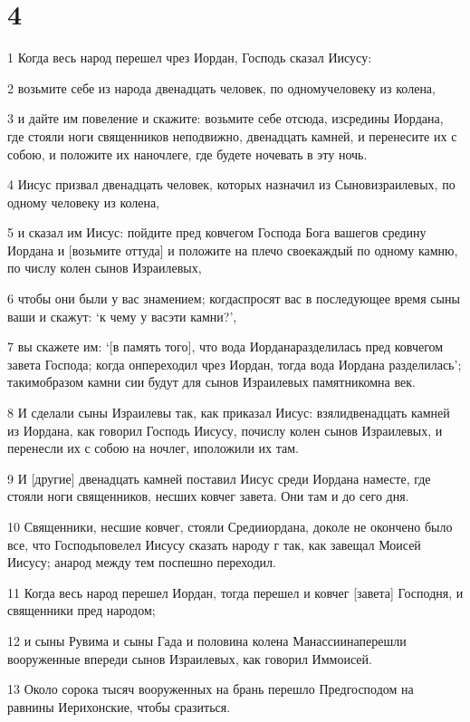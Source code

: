 \chapter{4}

\par 1 Когда весь народ перешел чрез Иордан, Господь сказал Иисусу:
\par 2 возьмите себе из народа двенадцать человек, по одномучеловеку из колена,
\par 3 и дайте им повеление и скажите: возьмите себе отсюда, изсредины Иордана, где стояли ноги священников неподвижно, двенадцать камней, и перенесите их с собою, и положите их наночлеге, где будете ночевать в эту ночь.
\par 4 Иисус призвал двенадцать человек, которых назначил из Сыновизраилевых, по одному человеку из колена,
\par 5 и сказал им Иисус: пойдите пред ковчегом Господа Бога вашегов средину Иордана и [возьмите оттуда] и положите на плечо своекаждый по одному камню, по числу колен сынов Израилевых,
\par 6 чтобы они были у вас знамением; когдаспросят вас в последующее время сыны ваши и скажут: `к чему у васэти камни?',
\par 7 вы скажете им: `[в память того], что вода Иорданаразделилась пред ковчегом завета Господа; когда онпереходил чрез Иордан, тогда вода Иордана разделилась'; такимобразом камни сии будут для сынов Израилевых памятникомна век.
\par 8 И сделали сыны Израилевы так, как приказал Иисус: взялидвенадцать камней из Иордана, как говорил Господь Иисусу, почислу колен сынов Израилевых, и перенесли их с собою на ночлег, иположили их там.
\par 9 И [другие] двенадцать камней поставил Иисус среди Иордана наместе, где стояли ноги священников, несших ковчег завета. Они там и до сего дня.
\par 10 Священники, несшие ковчег, стояли Средииордана, доколе не окончено было все, что Господьповелел Иисусу сказать народу г так, как завещал Моисей Иисусу; анарод между тем поспешно переходил.
\par 11 Когда весь народ перешел Иордан, тогда перешел и ковчег [завета] Господня, и священники пред народом;
\par 12 и сыны Рувима и сыны Гада и половина колена Манассиинаперешли вооруженные впереди сынов Израилевых, как говорил Иммоисей.
\par 13 Около сорока тысяч вооруженных на брань перешло Предгосподом на равнины Иерихонские, чтобы сразиться.
